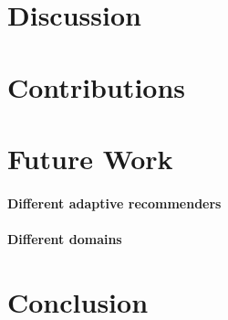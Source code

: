 \label{chap:discussion}


\section{Discussion}      


\section{Contributions} 


\section{Future Work}      

\paragraph{Different adaptive recommenders}
\paragraph{Different domains}


\section{Conclusion}      


